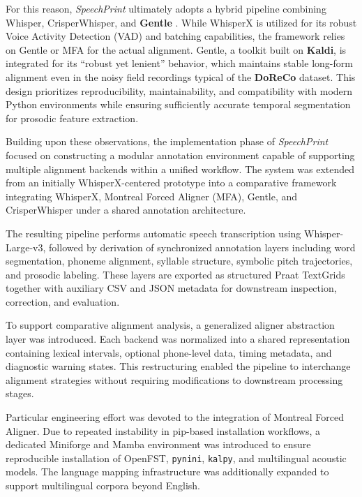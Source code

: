 For this reason, \textit{SpeechPrint} ultimately adopts a hybrid pipeline combining Whisper, CrisperWhisper, and \textbf{Gentle} \cite{ochshorn2015gentle}. While WhisperX is utilized for its robust Voice Activity Detection (VAD) and batching capabilities, the framework relies on Gentle or MFA for the actual alignment. Gentle, a toolkit built on \textbf{Kaldi}, is integrated for its ``robust yet lenient'' behavior, which maintains stable long-form alignment even in the noisy field recordings typical of the \textbf{DoReCo} dataset. This design prioritizes reproducibility, maintainability, and compatibility with modern Python environments while ensuring sufficiently accurate temporal segmentation for prosodic feature extraction.

Building upon these observations, the implementation phase of \textit{SpeechPrint} focused on constructing a modular annotation environment capable of supporting multiple alignment backends within a unified workflow. The system was extended from an initially WhisperX-centered prototype into a comparative framework integrating WhisperX, Montreal Forced Aligner (MFA), Gentle, and CrisperWhisper under a shared annotation architecture.

The resulting pipeline performs automatic speech transcription using Whisper-Large-v3, followed by derivation of synchronized annotation layers including word segmentation, phoneme alignment, syllable structure, symbolic pitch trajectories, and prosodic labeling. These layers are exported as structured Praat TextGrids together with auxiliary CSV and JSON metadata for downstream inspection, correction, and evaluation.

To support comparative alignment analysis, a generalized aligner abstraction layer was introduced. Each backend was normalized into a shared representation containing lexical intervals, optional phone-level data, timing metadata, and diagnostic warning states. This restructuring enabled the pipeline to interchange alignment strategies without requiring modifications to downstream processing stages.

Particular engineering effort was devoted to the integration of Montreal Forced Aligner. Due to repeated instability in pip-based installation workflows, a dedicated Miniforge and Mamba environment was introduced to ensure reproducible installation of OpenFST, \texttt{pynini}, \texttt{kalpy}, and multilingual acoustic models. The language mapping infrastructure was additionally expanded to support multilingual corpora beyond English.

